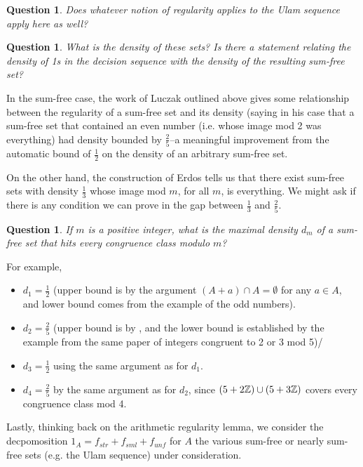 \documentclass{article}
\newtheorem{question}[theorem]{Question}
\theoremstyle{definition}
\theoremstyle{remark}
\numberwithin{equation}{section}
\begin{document}
\begin{question}\label{qn:sumfree_regularity}
  Does whatever notion of regularity applies to the Ulam sequence
  apply here as well?
\end{question}

\begin{question}\label{qn:sumfree_density}
  What is the density of these sets?  Is there a statement relating
  the density of 1s in the decision sequence with the density of the
  resulting sum-free set?
\end{question}

In the sum-free case, the work of Luczak outlined above gives some
relationship between the regularity of a sum-free set and its density
(saying in his case that a sum-free set that contained an even number
(i.e. whose image mod 2 was everything) had density bounded by
$\frac25$--a meaningful improvement from the automatic bound of
$\frac12$ on the density of an arbitrary sum-free set.

On the other hand, the construction of Erdos tells us that there exist
sum-free sets with density $\frac13$ whose image mod $m$, for all $m$,
is everything.  We might ask if there is any condition we can prove in
the gap between $\frac13$ and $\frac25$.  

\begin{question}\label{qn:irregularity_density}
  If $m$ is a positive integer, what is the maximal density $d_m$ of a
  sum-free set that hits every congruence class modulo $m$?
\end{question}

For example, 

\begin{itemize}
\item $d_1 = \frac12$ (upper bound is by the argument $(A + a) \cap A =
  \emptyset$ for any $a\in A$, and lower bound comes from the example
  of the odd numbers).
\item $d_2 = \frac25$ (upper bound is by
  \cite{sumfree_regularity_luczak}, and the lower bound is established
  by the example from the same paper of integers congruent to 2 or 3
  mod 5)/
\item $d_3 = \frac12$ using the same argument as for $d_1$.
\item $d_4 = \frac25$ by the same argument as for $d_2$, since
  $(5+2\mathbb{Z}) \cup (5+3\mathbb{Z})$ covers every congruence class mod 4.
\end{itemize}

Lastly, thinking back on the arithmetic regularity lemma, we consider
the decpomosition $1_A = f_{str} + f_{sml} + f_{unf}$ for $A$ the
various sum-free or nearly sum-free sets (e.g. the Ulam sequence)
under consideration.  
\end{document}
